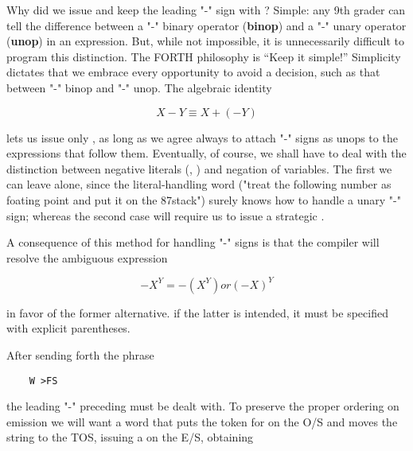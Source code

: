 \begin{dd}
\leftbar[1\linewidth]
Why did we issue  and keep the leading "-" sign with ? Simple: any 9th grader can tell the difference between a "-" binary operator (\textbf{binop}) and a "-" unary operator (\textbf{unop}) in an expression. But, while not impossible, it is unnecessarily difficult to program this distinction. The FORTH philosophy is “Keep it simple!” Simplicity dictates that we embrace every opportunity to avoid a decision, such as that between "-" binop and "-" unop. The algebraic identity
\endleftbar

\begin{equation*}
X - Y \equiv X + (-Y)
\end{equation*}

\leftbar[1\linewidth]
lets us issue only  , as long as we agree always to attach "-" signs as unops to the expressions that follow them. Eventually, of course, we shall have to deal with the distinction between negative literals (, \eg) and negation of variables. The first we can leave alone, since the literal-handling word \bc{\%} ("treat the following number as foating point and put it on the 87stack") surely knows how to handle a unary "-" sign; whereas the second case will require us to issue a strategic .
\endleftbar

A consequence of this method for handling "-" signs is that the
compiler will resolve the ambiguous expression

\begin{equation*}
-X^{Y} = -(X^{Y}) or (-X)^{Y}
\end{equation*}

in favor of the former alternative. if the latter is intended, it must be specified with explicit parentheses.

After sending forth the phrase

\begin{lstlisting}
    W >FS
\end{lstlisting}

the leading "-" preceding  must be dealt with. To preserve the proper ordering on emission we will want a word  that puts the token for  on the O/S and moves the string  to the TOS, issuing a  on the E/S, obtaining


\end{dd}
